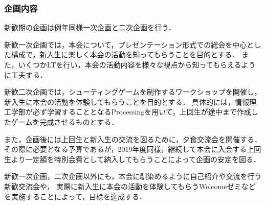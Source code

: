 \subsubsection*{企画内容}
新歓期の企画は例年同様一次企画と二次企画を行う．

新歓一次企画では，本会について，プレゼンテーション形式での総会を中心とした構成で，新入生に楽しく本会の活動を知ってもらうことを目的とする．
また，いくつかLTを行い，本会の活動内容を様々な視点から知ってもらえるように工夫する．

新歓二次企画では，シューティングゲームを制作するワークショップを開催し，新入生に本会の活動を体験してもらうことを目的とする．
具体的には，情報理工学部\firstGrade{}が必ず学習することとなるProcessingを用いて，上回生が途中まで作成したゲームを完成させるものとする．

また，企画後には上回生と新入生の交流を図るために，夕食交流会を開催する．
その際に必要となる予算であるが，2019年度同様，継続して本会に入会する上回生より一定額を特別会費として納入してもらうことによって企画の安定を図る．

新歓一次企画，二次企画以外にも，本会に馴染めるように自己紹介や交流を行う新歓交流会や，
実際に新入生に本会の活動を体験してもらうWelcomeゼミなどを実施することによって，目標を達成する．

